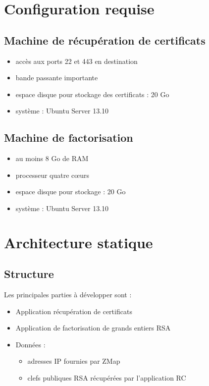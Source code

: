 \documentclass[a4paper,11pt,french]{article}
\begin{document}
\section{Configuration requise}
\subsection{Machine de récupération de certificats}
\begin{itemize}
\item accès aux ports 22 et 443 en destination
\item bande passante importante
\item espace disque pour stockage des certificats : 20 Go
\item système : Ubuntu Server 13.10
\end{itemize}

\subsection{Machine de factorisation}
\begin{itemize}
\item au moins 8 Go de RAM
\item processeur quatre cœurs
\item espace disque pour stockage : 20 Go
\item système : Ubuntu Server 13.10
\end{itemize}

\section{Architecture statique}

\subsection{Structure}
Les principales parties à développer sont :
\begin{itemize}
\item Application récupération de certificats
\item Application de factorisation de grands entiers RSA
\item Données :
\begin{itemize}
\item adresses IP fournies par ZMap
\item clefs publiques RSA récupérées par l'application RC
\end{itemize}
\end{itemize}
\end{document}
